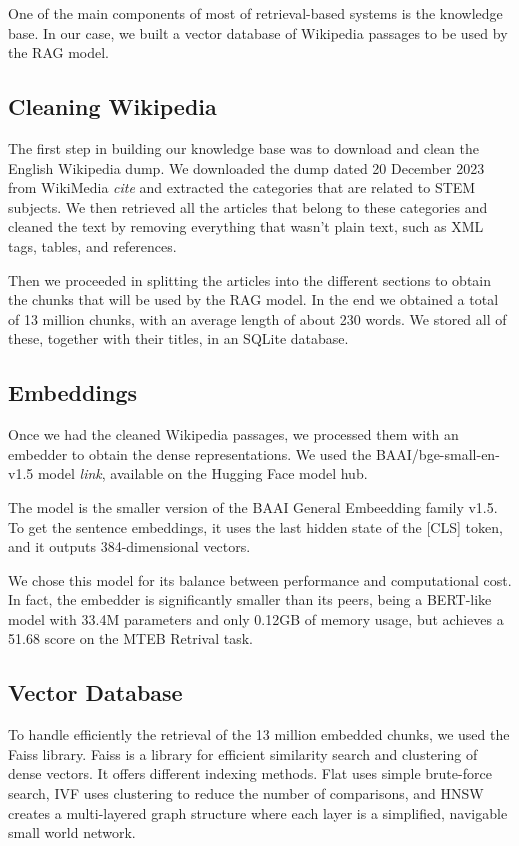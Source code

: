 \documentclass[11pt]{article}
\begin{document}
One of the main components of most of retrieval-based systems is the knowledge base.
In our case, we built a vector database of Wikipedia passages to be used by the RAG model.

\subsection{Cleaning Wikipedia}

The first step in building our knowledge base was to download and clean the English
Wikipedia dump. We downloaded the dump dated 20 December 2023 from WikiMedia \textit{cite} 
and extracted the categories that are related to STEM subjects. 
We then retrieved all the articles that belong to these categories and cleaned the text
by removing everything that wasn't plain text, such as XML tags, tables, and references.

Then we proceeded in splitting the articles into the different sections to obtain the chunks 
that will be used by the RAG model. 
In the end we obtained a total of 13 million chunks, with an average length of about 230 words.
We stored all of these, together with their titles, in an SQLite database.

\subsection{Embeddings}

Once we had the cleaned Wikipedia passages, we processed them with an embedder to obtain the dense 
representations.
We used the BAAI/bge-small-en-v1.5 model \textit{link}, available on the Hugging Face model hub.

The model is the smaller version of the BAAI General Embeedding family v1.5. 
To get the sentence embeddings, it uses the last hidden state of the [CLS] token, and it outputs 
384-dimensional vectors.

We chose this model for its balance between performance and computational cost.
In fact, the embedder is significantly smaller than its peers, being a BERT-like model with 33.4M 
parameters and only 0.12GB of memory usage, but achieves a 51.68 score on the MTEB Retrival task.

\subsection{Vector Database}

To handle efficiently the retrieval of the 13 million embedded chunks, we used the Faiss library. 
Faiss is a library for efficient similarity search and clustering of dense vectors. 
It offers different indexing methods. Flat uses simple brute-force search, 
IVF uses clustering to reduce the number of comparisons,
and HNSW creates a multi-layered graph structure where each layer is a simplified, 
navigable small world network. 
\end{document}
